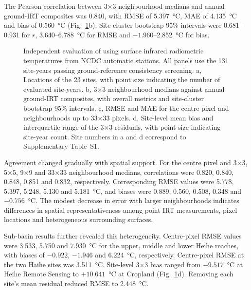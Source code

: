 The Pearson correlation between \chinatherm{} 3$\times$3 neighbourhood medians and annual ground-IRT composites was 0.840, with RMSE of 5.397~°C, MAE of 4.135~°C and bias of 0.560~°C (Fig.~\ref*{fig:ground-validation}b). Site-cluster bootstrap 95\% intervals were 0.681--0.931 for $r$, 3.640--6.788~°C for RMSE and $-1.960$--2.852~°C for bias.

\begin{figure}[H]
\centering
{}
\ReviewFloatBegin
\caption{Independent evaluation of \chinatherm{} using surface infrared radiometric temperatures from NCDC automatic stations. All panels use the 131 site-years passing ground-reference consistency screening. a, Locations of the 23 sites, with point size indicating the number of evaluated site-years. b, \chinatherm{} 3$\times$3 neighbourhood medians against annual ground-IRT composites, with overall metrics and site-cluster bootstrap 95\% intervals. c, RMSE and MAE for the centre pixel and neighbourhoods up to 33$\times$33 pixels. d, Site-level mean bias and interquartile range of the 3$\times$3 residuals, with point size indicating site-year count. Site numbers in a and d correspond to Supplementary Table~S1.}
\label{fig:ground-validation}
\ReviewFloatEnd
\end{figure}

Agreement changed gradually with spatial support. For the centre pixel and 3$\times$3, 5$\times$5, 9$\times$9 and 33$\times$33 neighbourhood medians, correlations were 0.820, 0.840, 0.848, 0.851 and 0.832, respectively. Corresponding RMSE values were 5.778, 5.397, 5.248, 5.130 and 5.181~°C, and biases were 0.889, 0.560, 0.508, 0.348 and $-0.756$~°C. The modest decrease in error with larger neighbourhoods indicates differences in spatial representativeness among point IRT measurements, pixel locations and heterogeneous surrounding surfaces.

Sub-basin results further revealed this heterogeneity. Centre-pixel RMSE values were 3.533, 5.750 and 7.930~°C for the upper, middle and lower Heihe reaches, with biases of $-0.922$, $-1.946$ and 6.224~°C, respectively. Centre-pixel RMSE at the two Haihe sites was 3.511~°C. Site-level 3$\times$3 bias ranged from $-9.517$~°C at Heihe Remote Sensing to $+10.641$~°C at Cropland (Fig.~\ref*{fig:ground-validation}d). Removing each site's mean residual reduced RMSE to 2.448~°C.
